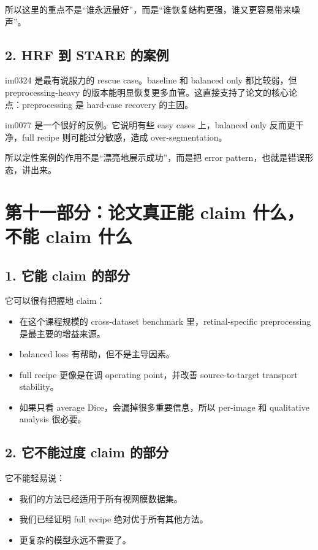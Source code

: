 \documentclass[12pt,a4paper]{ctexart}
\begin{document}
所以这里的重点不是“谁永远最好”，而是“谁恢复结构更强，谁又更容易带来噪声”。

\subsection*{2. HRF 到 STARE 的案例}

im0324 是最有说服力的 rescue case。baseline 和 balanced only 都比较弱，但 preprocessing-heavy 的版本能明显恢复更多血管。这直接支持了论文的核心论点：preprocessing 是 hard-case recovery 的主因。

im0077 是一个很好的反例。它说明有些 easy cases 上，balanced only 反而更干净，full recipe 则可能过分敏感，造成 over-segmentation。

所以定性案例的作用不是“漂亮地展示成功”，而是把 error pattern，也就是错误形态，讲出来。

\section*{第十一部分：论文真正能 claim 什么，不能 claim 什么}

\subsection*{1. 它能 claim 的部分}

它可以很有把握地 claim：

\begin{itemize}[leftmargin=1.6em]
  \item 在这个课程规模的 cross-dataset benchmark 里，retinal-specific preprocessing 是最主要的增益来源。
  \item balanced loss 有帮助，但不是主导因素。
  \item full recipe 更像是在调 operating point，并改善 source-to-target transport stability。
  \item 如果只看 average Dice，会漏掉很多重要信息，所以 per-image 和 qualitative analysis 很必要。
\end{itemize}

\subsection*{2. 它不能过度 claim 的部分}

它不能轻易说：

\begin{itemize}[leftmargin=1.6em]
  \item 我们的方法已经适用于所有视网膜数据集。
  \item 我们已经证明 full recipe 绝对优于所有其他方法。
  \item 更复杂的模型永远不需要了。
\end{itemize}
\end{document}
